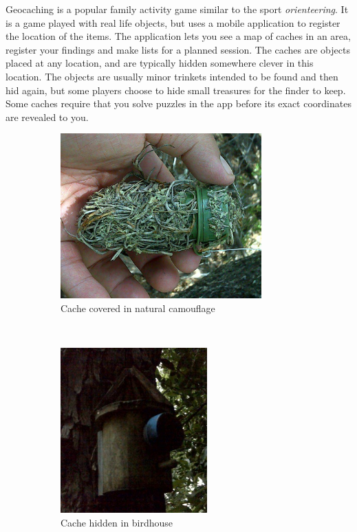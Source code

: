 Geocaching is a popular family activity game similar to the sport \emph{orienteering}. It is a game played with real life objects, but uses a mobile application to register the location of the items. The application lets you see a map of caches in an area, register your findings and make lists for a planned session. The caches are objects placed at any location, and are typically hidden somewhere clever in this location. The objects are usually minor trinkets intended to be found and then hid again, but some players choose to hide small treasures for the finder to keep. Some caches require that you solve puzzles in the app before its exact coordinates are revealed to you.

\begin{figure}[h]
	\centering
	\begin{subfigure}[t]{0.5\textwidth}
		\includegraphics[height=2.5in]{Figures/chaoticgoblin-geocache-covered}
		\caption{Cache covered in natural camouflage}
	\end{subfigure}
	~
	\begin{subfigure}[t]{0.4\textwidth}
		\includegraphics[height=2.5in]{Figures/chaoticgoblin-geocache-birdhouse}
		\caption{Cache hidden in birdhouse}
	\end{subfigure}
	~
	\begin{subfigure}[t]{\textwidth}

\end{subfigure}
\end{figure}
